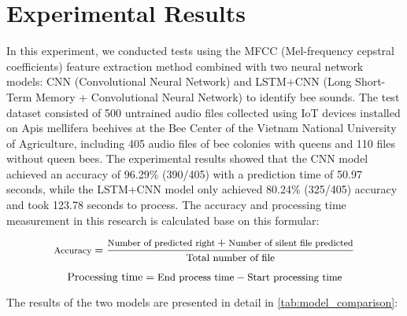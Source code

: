 \section{Experimental Results}
In this experiment, we conducted tests using the MFCC (Mel-frequency cepstral coefficients)
feature extraction method combined with two neural network models: CNN (Convolutional Neural
Network) and LSTM+CNN (Long Short-Term Memory + Convolutional Neural Network) to identify
bee sounds. The test dataset consisted of 500 untrained audio files collected using IoT
devices installed on Apis mellifera beehives at the Bee Center of the Vietnam National University of Agriculture,
including 405 audio files of bee colonies with queens and 110 files without
queen bees. The experimental results showed that the CNN model achieved an accuracy of
96.29\% (390/405) with a prediction time of 50.97 seconds, while the LSTM+CNN model only
achieved 80.24\% (325/405) accuracy and took 123.78 seconds to process.
The accuracy and processing time measurement in this research is
calculated base on this formular:

\vspace{-1em}
\begin{equation}
  \footnotesize \text{Accuracy}
  = \frac{\footnotesize \text{Number of predicted right} + \text{\footnotesize Number of silent file predicted}}{\small \text{Total number of file}}
\end{equation}
\vspace{-1em}

\vspace{-1em}
\begin{equation}
  \text{Processing time} = \text{\small End process time} - \text{\small Start processing time}
\end{equation}
\vspace{-1em}

The results of the two models are presented in detail in \autoref{tab:model_comparison}:

\vspace{-1em}
\begin{table}[H]
  \centering
  \caption{Comparison of accuracy and processing time between models}
  \label{tab:model_comparison}
\end{table}
\vspace{-1em}

